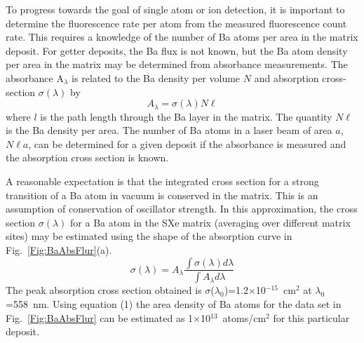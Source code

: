 \documentclass[aps,pra,reprint,superscriptaddress]{revtex4-1}
\begin{document}
To progress towards the goal of single atom or ion detection, it is important to determine the fluorescence rate per atom from the measured fluorescence count rate.
This requires a knowledge of the number of Ba atoms per area in the matrix deposit.
For getter deposits, the Ba flux is not known, but the Ba atom density per area in the matrix may be determined from absorbance measurements.
The absorbance A$_\lambda$ is related to the Ba density per volume $N$ and absorption cross-section $\sigma (\lambda)$ by 
\begin{equation}
	A_\lambda=\sigma(\lambda) N \ell
\end{equation}
where $l$ is the path length through the Ba layer in the matrix.  
The quantity $N\ell$ is the Ba density per area.  
The number of Ba atoms in a laser beam of area $a$, $N\ell a$, can be determined for a given deposit if the absorbance is measured and the absorption cross section is known.

A reasonable expectation is that the integrated cross section for a strong transition of a Ba atom in vacuum is conserved in the matrix.
This is an assumption of conservation of oscillator strength.
In this approximation, the cross section $ \sigma(\lambda) $ for a Ba atom in the SXe matrix (averaging over different matrix sites) may be estimated using the shape of the absorption curve in Fig.~\ref{Fig:BaAbsFlur}(a).
\begin{equation}
	\sigma(\lambda)=A_\lambda\frac{\int\sigma(\lambda)d\lambda}{\int A_\lambda d\lambda}
\end{equation}
The peak absorption cross section obtained is  $\sigma$($\lambda_0$)=1.2$\times$10$^{-15}$~cm$^2$ at $\lambda_0$=558~nm.  
Using equation (1) the area density of Ba atoms for the data set in Fig.~\ref{Fig:BaAbsFlur} can be estimated as 1$\times$10$^{13}$~atoms/cm$^2$ 
for this particular deposit.
\end{document}
